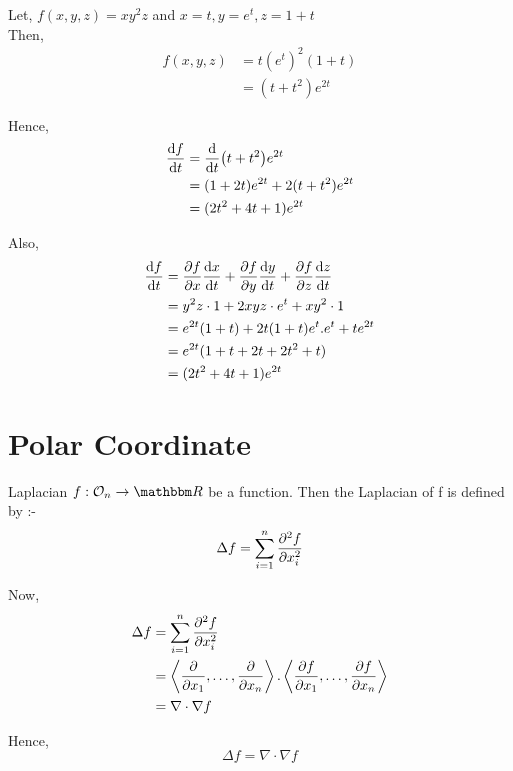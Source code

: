 \documentclass[Analysis-3]{subfiles}
\begin{document}
\begin{Eg}{}{}
	Let, $f(x,y,z) = xy^{2}z$ and $x=t, y=e^t, z= 1+t$ \\
	Then, \begin{align*}
		f(x,y,z) & = t(e^t)^2(1+t) \\
		         & = (t+t^2)e^{2t}
	\end{align*}

	Hence, \begin{align*}
		\dv{f}{t} & = \dv{t}(t+t^2)e^{2t}           \\
		          & = (1+2t)e^{2t} + 2(t+t^2)e^{2t} \\
		          & = (2t^2+4t+1)e^{2t}
	\end{align*}

	Also, \begin{align*}
		\dv{f}{t} & = \pdv{f}{x} \dv{x}{t} + \pdv{f}{y} \dv{y}{t} + \pdv{f}{z} \dv{z}{t} \\
		          & = y^2z\cdot 1 + 2xyz\cdot e^t + xy^2\cdot 1                          \\
		          & = e^{2t}(1+t) + 2t(1+t)e^t.e^t + te^{2t}                             \\
		          & = e^{2t}(1+t+2t+2t^2+t)                                              \\
		          & = (2t^2+4t+1)e^{2t}
	\end{align*}
\end{Eg}


\section{Polar Coordinate}

\begin{Def}{Laplacian}{}
	$f : \Op{n} \to \R$ be a function. Then the Laplacian of f is defined by :- \[ \Delta f = \sum_{i = 1}^{n} \pdv[2]{f}{x_i}   \]
\end{Def}

Now, \begin{align*}
	\Delta f & = \sum_{i=1}^{n} \pdv[2]{f}{x_i}                                                                                               \\
	         & = \left\langle \pdv{}{x_1}, \ldots, \pdv{}{x_n}  \right\rangle. \left\langle \pdv{f}{x_1}, \ldots, \pdv{f}{x_n}  \right\rangle \\
	         & = \nabla\cdot\nabla f
\end{align*}

Hence, \[\boxed{\Delta f = \nabla\cdot\nabla f}\]
\end{document}
